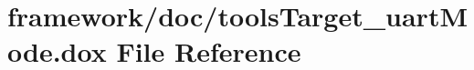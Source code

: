 \hypertarget{tools_target__uart_mode_8dox}{}\section{framework/doc/tools\+Target\+\_\+uart\+Mode.dox File Reference}
\label{tools_target__uart_mode_8dox}
